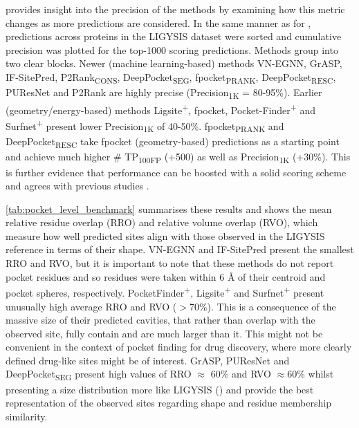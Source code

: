  provides insight into the precision of the methods by examining how this metric changes as more predictions are considered. In the same manner as for , predictions across proteins in the LIGYSIS dataset were sorted and cumulative precision was plotted for the top-1000 scoring predictions. Methods group into two clear blocks. Newer (machine learning-based) methods VN-EGNN, GrASP, IF-SitePred, P2Rank\textsubscript{CONS}, DeepPocket\textsubscript{SEG}, fpocket\textsubscript{PRANK}, DeepPocket\textsubscript{RESC}, PUResNet and P2Rank are highly precise (Precision\textsubscript{1K} = 80-95\%). Earlier (geometry/energy-based) methods Ligsite\textsuperscript{+}, fpocket, Pocket-Finder\textsuperscript{+} and Surfnet\textsuperscript{+} present lower Precision\textsubscript{1K} of 40-50\%. fpocket\textsubscript{PRANK} and DeepPocket\textsubscript{RESC} take fpocket (geometry-based) predictions as a starting point and achieve much higher \# TP\textsubscript{100FP} (+500) as well as Precision\textsubscript{1K} (+30\%). This is further evidence that performance can be boosted with a solid scoring scheme and agrees with previous studies \cite{KRIVAK_2015_PRANK, KRIVAK_2015_P2RANK, KRIVAK_2018_P2RANK, COMAJUNCOSA_2024_POCKETS}.

\autoref{tab:pocket_level_benchmark} summarises these results and shows the mean relative residue overlap (RRO) and relative volume overlap (RVO), which measure how well predicted sites align with those observed in the LIGYSIS reference in terms of their shape. VN-EGNN and IF-SitePred present the smallest RRO and RVO, but it is important to note that these methods do not report pocket residues and so residues were taken within 6 \AA{} of their centroid and pocket spheres, respectively. PocketFinder\textsuperscript{+}, Ligsite\textsuperscript{+} and Surfnet\textsuperscript{+} present unusually high average RRO and RVO ($>$70\%). This is a consequence of the massive size of their predicted cavities, that rather than overlap with the observed site, fully contain and are much larger than it. This might not be convenient in the context of pocket finding for drug discovery, where more clearly defined drug-like sites might be of interest. GrASP, PUResNet and DeepPocket\textsubscript{SEG} present high values of RRO $\approx$ 60\% and RVO $\approx$60\% whilst presenting a size distribution more like LIGYSIS () and provide the best representation of the observed sites regarding shape and residue membership similarity.

